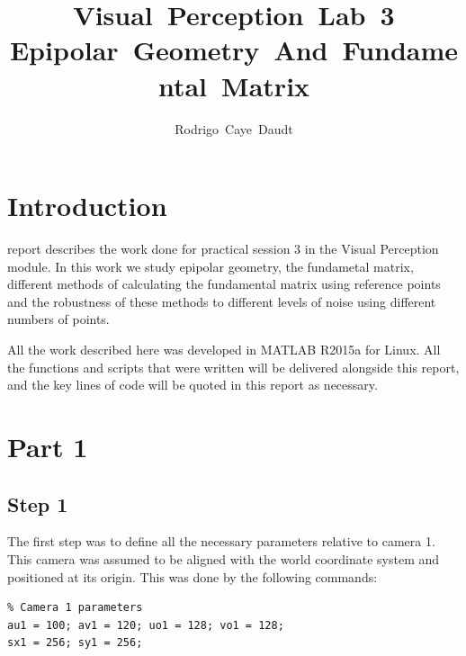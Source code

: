 \documentclass[peerreview,11pt]{IEEEtran}
\begin{document}
\title{Visual~Perception~Lab~3 \\ Epipolar~Geometry~And~Fundamental~Matrix}
%

\author{Rodrigo~Caye~Daudt}




\maketitle



\section{Introduction}

 report describes the work done for practical session 3 in the Visual Perception module. In this work we study epipolar geometry, the fundametal matrix, different methods of calculating the fundamental matrix using reference points and the robustness of these methods to different levels of noise using different numbers of points.

All the work described here was developed in MATLAB R2015a for Linux. All the functions and scripts that were written will be delivered alongside this report, and the key lines of code will be quoted in this report as necessary.

\section{Part 1}\label{p1}

\subsection{Step 1}

The first step was to define all the necessary parameters relative to camera 1. This camera was assumed to be aligned with the world coordinate system and positioned at its origin. This was done by the following commands:

\begin{verbatim}
% Camera 1 parameters
au1 = 100; av1 = 120; uo1 = 128; vo1 = 128;
sx1 = 256; sy1 = 256;
\end{verbatim}
\end{document}
